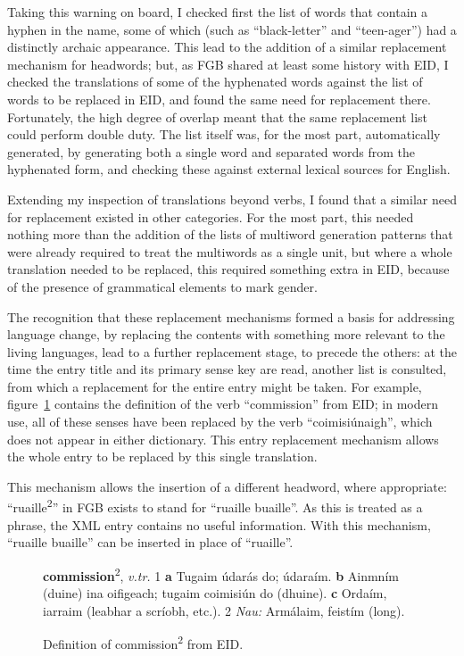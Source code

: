 Taking this warning on board, I checked first the list of words that contain a hyphen in the name, some of 
which (such as ``black-letter'' and ``teen-ager'') had a distinctly archaic appearance. This lead to the 
addition of a similar replacement mechanism for headwords; but, as FGB shared at least some history with EID, 
I checked the translations of some of the hyphenated words against the list of words to be replaced in EID, 
and found the same need for replacement there. Fortunately, the high degree of overlap meant that the same 
replacement list could perform double duty. The list itself was, for the most part, automatically generated, 
by generating both a single word and separated words from the hyphenated form, and checking these against 
external lexical sources for English.

Extending my inspection of translations beyond verbs, I found that a similar need for 
replacement existed in other categories. For the most part, this needed nothing more 
than the addition of the lists of multiword generation patterns that were already 
required to treat the multiwords as a single unit, but where a whole translation needed 
to be replaced, this required something extra in EID, because of the presence of 
grammatical elements to mark gender.

The recognition that these replacement mechanisms formed a basis for addressing language 
change, by replacing the contents with something more relevant to the living languages, 
lead to a further replacement stage, to precede the others: at the time the entry title 
and its primary sense key are read, another list is consulted, from which a replacement 
for the entire entry might be taken. 
For example, figure~\ref{fig:commission2} contains the definition of the verb 
``commission'' from EID; in modern use, all of these senses have been replaced 
by the verb ``coimisi\'unaigh'', which does not appear in either dictionary. 
This entry replacement mechanism allows the whole entry to be replaced by this 
single translation.

This mechanism allows the insertion of a different headword, where appropriate: 
``ruaille\textsuperscript{2}'' in FGB exists to stand for ``ruaille buaille''. 
As this is treated as a phrase, the XML entry contains no useful information. 
With this mechanism, ``ruaille buaille'' can be inserted in place of ``ruaille''.

\begin{figure}
\textbf{commission}\textsuperscript{2}, \textit{v.tr.} 1 \textbf{a} Tugaim údarás do; údaraím. \textbf{b} Ainmním (duine) ina oifigeach; tugaim coimisiún do (dhuine). \textbf{c} Ordaím, iarraim (leabhar a scríobh, etc.). 2 \textit{Nau:} Armálaim, feistím (long).
\label{fig:commission2}
\caption{Definition of commission\textsuperscript{2} from EID.}
\end{figure}

